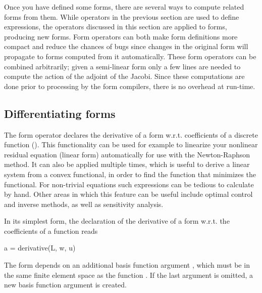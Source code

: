 Once you have defined some forms, there are several ways to compute
related forms from them.  While operators in the previous section are
used to define expressions, the operators discussed in this section are
applied to forms, producing new forms.  Form operators can both make form
definitions more compact and reduce the chances of bugs since changes in
the original form will propagate to forms computed from it automatically.
These form operators can be combined arbitrarily; given a semi-linear
form only a few lines are needed to compute the action of the adjoint
of the Jacobi.  Since these computations are done prior to processing
by the form compilers, there is no overhead at run-time.

\subsection{Differentiating forms}
\label{ufl:sec:derivative}

The form operator  declares the derivative of a form
w.r.t. coefficients of a discrete function ().  This
functionality can be used for example to linearize your nonlinear residual
equation (linear form) automatically for use with the Newton-Raphson
method.  It can also be applied multiple times, which is useful to
derive a linear system from a convex functional, in order to find the
function that minimizes the functional.  For non-trivial equations such
expressions can be tedious to calculate by hand.  Other areas in which
this feature can be useful include optimal control and inverse methods,
as well as sensitivity analysis.

In its simplest form, the declaration of the derivative of a form 
w.r.t. the coefficients of a function  reads
\begin{uflcode}
a = derivative(L, w, u)
\end{uflcode}
The form  depends on an additional basis function argument ,
which must be in the same finite element space as the function .
If the last argument is omitted, a new basis function argument is created.


